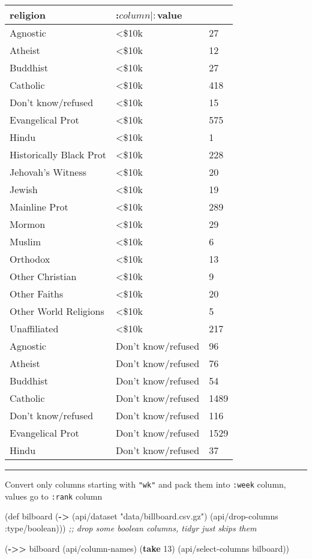 \documentclass[]{article}
\newenvironment{Shaded}{\begin{snugshade}}{\end{snugshade}}
\newcommand{\AttributeTok}[1]{\textcolor[rgb]{0.77,0.63,0.00}{#1}}
\newcommand{\BuiltInTok}[1]{#1}
\newcommand{\CommentTok}[1]{\textcolor[rgb]{0.56,0.35,0.01}{\textit{#1}}}
\newcommand{\DecValTok}[1]{\textcolor[rgb]{0.00,0.00,0.81}{#1}}
\newcommand{\FunctionTok}[1]{\textcolor[rgb]{0.00,0.00,0.00}{#1}}
\newcommand{\KeywordTok}[1]{\textcolor[rgb]{0.13,0.29,0.53}{\textbf{#1}}}
\newcommand{\NormalTok}[1]{#1}
\newcommand{\StringTok}[1]{\textcolor[rgb]{0.31,0.60,0.02}{#1}}
\begin{document}
\begin{longtable}[]{@{}lll@{}}
\toprule
religion & :\(column | :\)value &\tabularnewline
\midrule
\endhead
Agnostic & \textless{}\$10k & 27\tabularnewline
Atheist & \textless{}\$10k & 12\tabularnewline
Buddhist & \textless{}\$10k & 27\tabularnewline
Catholic & \textless{}\$10k & 418\tabularnewline
Don't know/refused & \textless{}\$10k & 15\tabularnewline
Evangelical Prot & \textless{}\$10k & 575\tabularnewline
Hindu & \textless{}\$10k & 1\tabularnewline
Historically Black Prot & \textless{}\$10k & 228\tabularnewline
Jehovah's Witness & \textless{}\$10k & 20\tabularnewline
Jewish & \textless{}\$10k & 19\tabularnewline
Mainline Prot & \textless{}\$10k & 289\tabularnewline
Mormon & \textless{}\$10k & 29\tabularnewline
Muslim & \textless{}\$10k & 6\tabularnewline
Orthodox & \textless{}\$10k & 13\tabularnewline
Other Christian & \textless{}\$10k & 9\tabularnewline
Other Faiths & \textless{}\$10k & 20\tabularnewline
Other World Religions & \textless{}\$10k & 5\tabularnewline
Unaffiliated & \textless{}\$10k & 217\tabularnewline
Agnostic & Don't know/refused & 96\tabularnewline
Atheist & Don't know/refused & 76\tabularnewline
Buddhist & Don't know/refused & 54\tabularnewline
Catholic & Don't know/refused & 1489\tabularnewline
Don't know/refused & Don't know/refused & 116\tabularnewline
Evangelical Prot & Don't know/refused & 1529\tabularnewline
Hindu & Don't know/refused & 37\tabularnewline
\bottomrule
\end{longtable}

\begin{center}\rule{0.5\linewidth}{0.5pt}\end{center}

Convert only columns starting with \texttt{"wk"} and pack them into
\texttt{:week} column, values go to \texttt{:rank} column

\begin{Shaded}
\begin{Highlighting}[]
\NormalTok{(}\BuiltInTok{def}\FunctionTok{ bilboard }\NormalTok{(}\KeywordTok{->}\NormalTok{ (api/dataset }\StringTok{"data/billboard.csv.gz"}\NormalTok{)}
\NormalTok{                  (api/drop-columns }\AttributeTok{:type/boolean}\NormalTok{))) }\CommentTok{;; drop some boolean columns, tidyr just skips them}
\end{Highlighting}
\end{Shaded}

\begin{Shaded}
\begin{Highlighting}[]
\NormalTok{(}\KeywordTok{->>}\NormalTok{ bilboard}
\NormalTok{     (api/column-names)}
\NormalTok{     (}\KeywordTok{take} \DecValTok{13}\NormalTok{)}
\NormalTok{     (api/select-columns bilboard))}
\end{Highlighting}
\end{Shaded}
\end{document}
